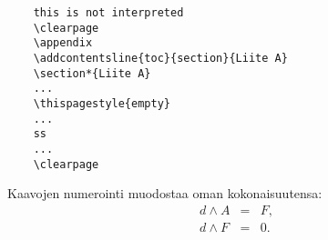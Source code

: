 \renewcommand{\theequation}{A\arabic{equation}}
\setcounter{equation}{0}  
\renewcommand{\thefigure}{A\arabic{figure}}
\setcounter{figure}{0}
\renewcommand{\thetable}{A\arabic{table}}
\setcounter{table}{0}


\begin{verbatim}
	this is not interpreted
	\clearpage
	\appendix
	\addcontentsline{toc}{section}{Liite A}
	\section*{Liite A}
	...
	\thispagestyle{empty}
	...
	ss
	...
	\clearpage
\end{verbatim}

Kaavojen numerointi muodostaa  oman kokonaisuutensa:
\begin{eqnarray}
d \wedge A  &=& F, \label{liitekaava1}\\
d \wedge F  &=& 0. \label{liitekaava2}
\end{eqnarray}